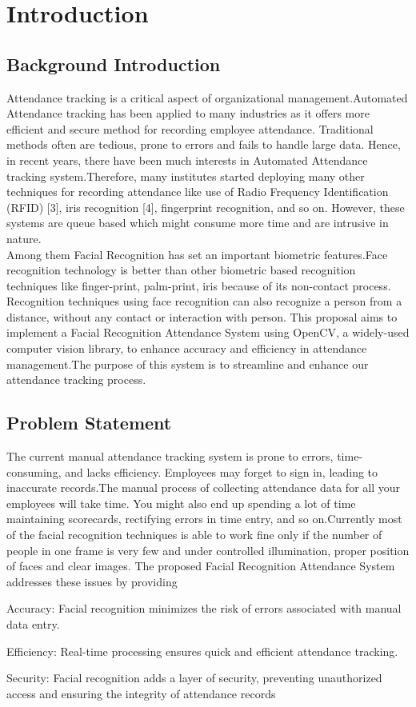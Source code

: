 \chapter{Introduction}
        \section{Background Introduction}
        Attendance tracking is a critical aspect of organizational management.Automated Attendance tracking has been applied to many industries as it offers  more efficient 
and secure method for recording employee attendance.
 Traditional methods often are tedious, prone to errors and fails to handle large data. Hence, in
 recent years, there have been much interests in Automated Attendance tracking system.Therefore,  many  institutes  started deploying  many  other  techniques  for  recording  attendance like  use of  Radio Frequency  Identification (RFID)  [3], iris recognition [4], fingerprint recognition, and so on. However, these  systems  are queue  based which  might  consume  more time and are intrusive in nature.
 \\
 Among them Facial Recognition has set an important biometric features.Face recognition
technology is better than other biometric based recognition
techniques like finger-print, palm-print, iris because of its
non-contact process. Recognition techniques using face
recognition can also recognize a person from a distance,
without any contact or interaction with person.
 This proposal aims to implement a Facial Recognition Attendance System using OpenCV, a widely-used computer vision library, to enhance accuracy and efficiency in attendance management.The purpose of this system is to streamline and enhance our attendance 
tracking process.
 
        \section{Problem Statement}
         The current manual attendance tracking system is prone to errors, time-consuming, and lacks efficiency. Employees may forget to sign in, leading to inaccurate records.The manual process of collecting attendance data for all your employees will  take time. You might also end up spending a lot of time maintaining scorecards, rectifying errors in time entry, and so on.Currently most of the facial recognition techniques is
able to work fine only if the number of people in one frame
is very few and under controlled illumination, proper position of faces and clear images. The proposed Facial Recognition Attendance System addresses these issues by providing

Accuracy: Facial recognition minimizes the risk of errors associated with manual data entry.

Efficiency: Real-time processing ensures quick and efficient attendance tracking.

Security: Facial recognition adds a layer of security, preventing unauthorized access and ensuring the integrity of attendance records
     
